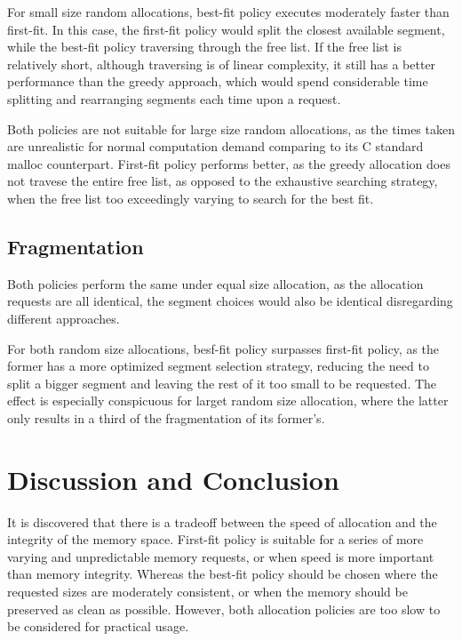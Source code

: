 \documentclass[12pt, letterpaper]{article}
\begin{document}
      For small size random allocations, best-fit policy executes moderately faster than first-fit.  
      In this case, the first-fit policy would split the closest available segment,
      while the best-fit policy traversing through the free list. 
      If the free list is relatively short, although traversing is of linear complexity,
      it still has a better performance than the greedy approach,
      which would spend considerable time splitting and rearranging segments each time upon a request. 

      Both policies are not suitable for large size random allocations, 
      as the times taken are unrealistic for normal computation demand comparing to its C standard malloc counterpart. 
      First-fit policy performs better, as the greedy allocation does not travese the entire free list,
      as opposed to the exhaustive searching strategy, 
      when the free list too exceedingly varying to search for the best fit. 

    \subsection*{Fragmentation}
      Both policies perform the same under equal size allocation, as the allocation requests are all identical, 
      the segment choices would also be identical disregarding different approaches.

      For both random size allocations, besf-fit policy surpasses first-fit policy, 
      as the former has a more optimized segment selection strategy, 
      reducing the need to split a bigger segment and leaving the rest of it too small to be requested. 
      The effect is especially conspicuous for larget random size allocation, 
      where the latter only results in a third of the fragmentation of its former's. 

  \section*{Discussion and Conclusion}
    It is discovered that there is a tradeoff between the speed of allocation and the integrity of the memory space.
    First-fit policy is suitable for a series of more varying and unpredictable memory requests,
    or when speed is more important than memory integrity. 
    Whereas the best-fit policy should be chosen where the requested sizes are moderately consistent,
    or when the memory should be preserved as clean as possible. 
    However, both allocation policies are too slow to be considered for practical usage. 
\end{document}
